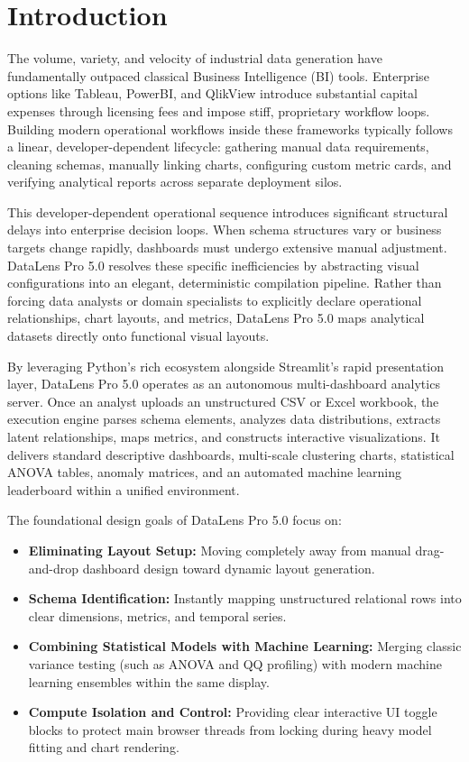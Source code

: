 \documentclass[11pt,a4paper,titlepage]{article}
\begin{document}
\newpage
\tableofcontents
\newpage


\section{Introduction}
The volume, variety, and velocity of industrial data generation have fundamentally outpaced classical Business Intelligence (BI) tools. Enterprise options like Tableau, PowerBI, and QlikView introduce substantial capital expenses through licensing fees and impose stiff, proprietary workflow loops. Building modern operational workflows inside these frameworks typically follows a linear, developer-dependent lifecycle: gathering manual data requirements, cleaning schemas, manually linking charts, configuring custom metric cards, and verifying analytical reports across separate deployment silos.

This developer-dependent operational sequence introduces significant structural delays into enterprise decision loops. When schema structures vary or business targets change rapidly, dashboards must undergo extensive manual adjustment. DataLens Pro 5.0 resolves these specific inefficiencies by abstracting visual configurations into an elegant, deterministic compilation pipeline. Rather than forcing data analysts or domain specialists to explicitly declare operational relationships, chart layouts, and metrics, DataLens Pro 5.0 maps analytical datasets directly onto functional visual layouts.

By leveraging Python's rich ecosystem alongside Streamlit's rapid presentation layer, DataLens Pro 5.0 operates as an autonomous multi-dashboard analytics server. Once an analyst uploads an unstructured CSV or Excel workbook, the execution engine parses schema elements, analyzes data distributions, extracts latent relationships, maps metrics, and constructs interactive visualizations. It delivers standard descriptive dashboards, multi-scale clustering charts, statistical ANOVA tables, anomaly matrices, and an automated machine learning leaderboard within a unified environment.

The foundational design goals of DataLens Pro 5.0 focus on:
\begin{itemize}
    \item \textbf{Eliminating Layout Setup:} Moving completely away from manual drag-and-drop dashboard design toward dynamic layout generation.
    \item \textbf{Schema Identification:} Instantly mapping unstructured relational rows into clear dimensions, metrics, and temporal series.
    \item \textbf{Combining Statistical Models with Machine Learning:} Merging classic variance testing (such as ANOVA and QQ profiling) with modern machine learning ensembles within the same display.
    \item \textbf{Compute Isolation and Control:} Providing clear interactive UI toggle blocks to protect main browser threads from locking during heavy model fitting and chart rendering.
\end{itemize}
\end{document}
